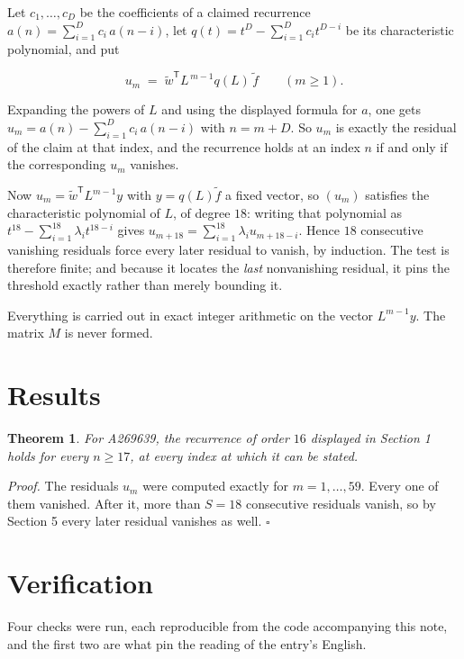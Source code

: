 \documentclass[11pt]{article}
\newtheorem{theorem}{Theorem}
\theoremstyle{definition}
\begin{document}
Let $c_1,\dots,c_D$ be the coefficients of a claimed recurrence $a(n) = \sum_{i=1}^{D} c_i\,a(n-i)$, let $q(t) = t^{D} - \sum_{i=1}^{D} c_i t^{D-i}$ be its characteristic polynomial, and put

\[u_m \;=\; \tilde w^{\mathsf T} L^{\,m-1} q(L)\,\tilde f \qquad (m \ge 1).\]

Expanding the powers of $L$ and using the displayed formula for $a$, one gets $u_m = a(n) - \sum_{i=1}^{D} c_i\,a(n-i)$ with $n = m + D$. So $u_m$ is exactly the residual of the claim at that index, and the recurrence holds at an index $n$ if and only if the corresponding $u_m$ vanishes.

Now $u_m = \tilde w^{\mathsf T} L^{m-1} y$ with $y = q(L)\tilde f$ a fixed vector, so $(u_m)$ satisfies the characteristic polynomial of $L$, of degree $18$: writing that polynomial as $t^{18} - \sum_{i=1}^{18} \lambda_i t^{18-i}$ gives $u_{m+18} = \sum_{i=1}^{18} \lambda_i u_{m+18-i}$. Hence $18$ consecutive vanishing residuals force every later residual to vanish, by induction. The test is therefore finite; and because it locates the {\itshape last} nonvanishing residual, it pins the threshold exactly rather than merely bounding it.

Everything is carried out in exact integer arithmetic on the vector $L^{m-1}y$. The matrix $M$ is never formed.

\section{Results}

\begin{theorem} For A269639, the recurrence of order $16$ displayed in Section 1 holds for every $n \ge 17$, at every index at which it can be stated.\end{theorem}

{\itshape Proof.} The residuals $u_m$ were computed exactly for $m = 1,\dots,59$. Every one of them vanished. After it, more than $S = 18$ consecutive residuals vanish, so by Section 5 every later residual vanishes as well. $\square$

\section{Verification}

Four checks were run, each reproducible from the code accompanying this note, and the first two are what pin the reading of the entry's English.
\end{document}
